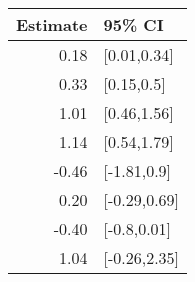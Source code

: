 \begin{tabular}{rl}
  \hline
Estimate & 95\% CI \\ 
  \hline
0.18 & [0.01,0.34] \\ 
  0.33 & [0.15,0.5] \\ 
  1.01 & [0.46,1.56] \\ 
  1.14 & [0.54,1.79] \\ 
  -0.46 & [-1.81,0.9] \\ 
  0.20 & [-0.29,0.69] \\ 
  -0.40 & [-0.8,0.01] \\ 
  1.04 & [-0.26,2.35] \\ 
   \hline
\end{tabular}

